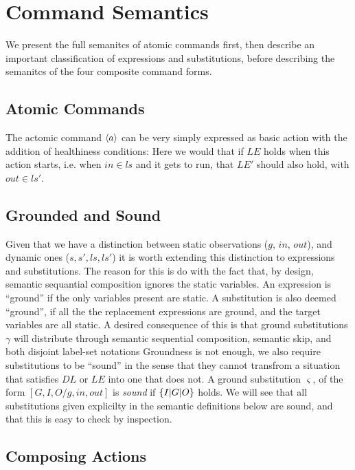 \section{Command Semantics}\label{sec:semantics}

We present the full semanitcs of atomic commands first,
then describe an important classification of expressions and substitutions,
before describing the semanitcs of the four composite command forms.

\subsection{Atomic Commands}\label{ssec:atomic}

The actomic command $\langle a\rangle$ can be very simply expressed as basic action
with the addition of healthiness conditions:
Here we would that if $LE$ holds when this action starts,
i.e. when $in \in ls$ and it gets to run,
that $LE'$ should also hold, with $out \in ls'$.

\subsection{Grounded and Sound}

Given that we have a distinction between static observations ($g$, $in$, $out$),
and dynamic ones ($s,s',ls,ls'$) it is worth extending this distinction
to expressions and substitutions.
The reason for this is do with the fact that, by design,
semantic sequantial composition ignores the static variables.
An expression is ``ground'' if the only variables present are static.
A substitution is also deemed ``ground'',
if all the the replacement expressions are ground,
and the target variables are all static.
A desired consequence of this is that
ground substitutions $\gamma$
will distribute through semantic sequential composition,
semantic skip,
and both disjoint label-set notations
Groundness is not enough, we also require substitutions to be ``sound''
in the sense that they cannot transfrom a situation that satisfies $DL$
or $LE$ into one that does not.
A ground substitution $\varsigma$, of the form $[G,I,O/g,in,out]$ is \emph{sound}
if $\{{I|G|O}\}$ holds.
We will see that all substitutions given explicilty in the semantic definitions
below are sound, and that this is easy to check by inspection.


\subsection{Composing Actions}\label{ssec:composing}
